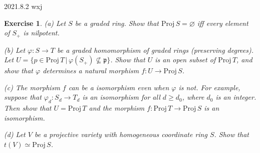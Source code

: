 \documentclass{amsart}
\newtheorem{exe}{Exercise}[subsection]
\theoremstyle{remark}\newtheorem{rmk}[theorem]{Remark}
\begin{document}
2021.8.2 wxj

\begin{exe}
	\label{2.2.14}
   (a) Let $S$ be a graded ring. Show that $\mathrm{Proj}\, S = \varnothing$ iff every element of $S_{+}$ is nilpotent.
   
   (b) Let $\varphi  : S \to T$ be a graded homomorphism of graded rings (preserving degrees). Let $U = \{ p \in \mathrm{Proj}\, T\, |\, \varphi(S_{+}) \not\subseteq \mathfrak{p} \}$. Show that $U$ is an open subset of $\mathrm{Proj}\, T$, and show that $\varphi$ determines a natural morphism $f : U \to \mathrm{Proj}\, S$.
   
   (c) The morphism $f$ can be a isomorphism even when $\varphi$ is not. For example, suppose that $\varphi_{d} : S_{d} \to T_{d}$ is an isomorphism for all $d \geq d_{0}$, where $d_{0}$ is an integer. Then show that $U = \mathrm{Proj}\, T$ and the morphism $f : \mathrm{Proj}\, T \to \mathrm{Proj}\, S$ is an isomorphism.
   
   (d) Let $V$ be a projective variety with homogeneous coordinate ring $S$. Show that $t(V) \simeq \mathrm{Proj}\, S$.
\end{exe}
\end{document}

